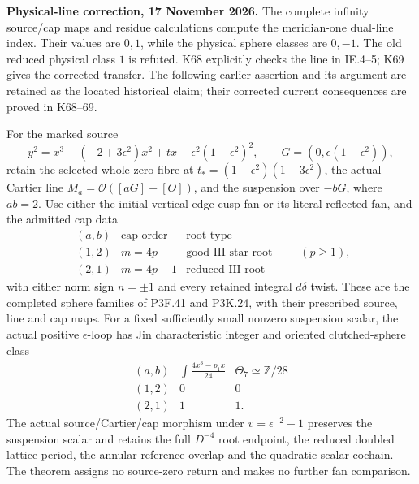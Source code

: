 \begin{theorem}\label{night:P3K.57}
\par\noindent\textbf{Physical-line correction, 17 November 2026.} The complete infinity source/cap maps and residue calculations compute the meridian-one dual-line index. Their values are \(0,1\), while the physical sphere classes are \(0,-1\). The old reduced physical class \(1\) is refuted. K68 explicitly checks the line in IE.4--5; K69 gives the corrected transfer. The following earlier assertion and its argument are retained as the located historical claim; their corrected current consequences are proved in K68--69.\medskip\par 
For the marked source
\[
 y^2=x^3+(-2+3\epsilon^2)x^2+t x
       +\epsilon^2(1-\epsilon^2)^2,\qquad
 G=(0,\epsilon(1-\epsilon^2)),
\]
retain the selected whole-zero fibre at
\(t_*=(1-\epsilon^2)(1-3\epsilon^2)\), the actual Cartier line
\(M_a=\mathcal O([aG]-[O])\), and the suspension over \(-bG\),
where \(ab=2\). Use either the initial vertical-edge cusp fan or its
literal reflected fan, and the admitted cap data
\[
 \begin{array}{c|c|c}
 (a,b)&\text{cap order}&\text{root type}\\ \hline
 (1,2)&m=4p&\text{good III-star root}\\
 (2,1)&m=4p-1&\text{reduced III root}
 \end{array}\qquad(p\ge1),
\]
with either norm sign \(n=\pm1\) and every retained integral
\(d\delta\) twist. These are the completed sphere families of
P3F.41 and P3K.24, with their prescribed source, line and cap maps.
For a fixed sufficiently small nonzero suspension scalar, the actual
positive \(\epsilon\)-loop has Jin characteristic integer and oriented
clutched-sphere class
\[
 \begin{array}{c|c|c}
 (a,b)&\displaystyle\int\frac{4x^3-p_1x}{24}
       &\Theta_7\simeq\mathbb Z/28\\ \hline
 (1,2)&0&0\\
 (2,1)&1&1.
 \end{array}
\]
The actual source/Cartier/cap morphism under
\(v=\epsilon^{-2}-1\) preserves the suspension scalar and retains
the full \(D^{-4}\) root endpoint, the reduced doubled lattice period,
the annular reference overlap and the quadratic scalar cochain.
The theorem assigns no source-zero return and makes no further fan comparison.
\end{theorem}
